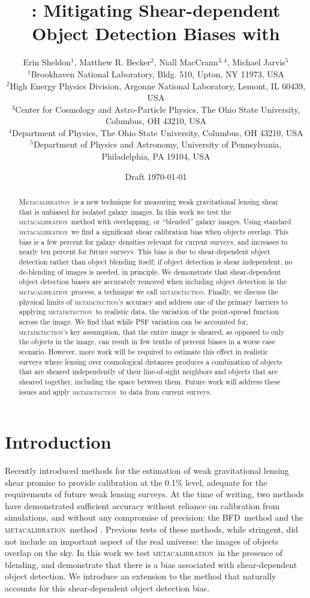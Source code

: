 \documentclass[fleqn,useAMS,usenatbib]{mnras}
\title[\Mdet]{\Mdet: Mitigating Shear-dependent Object Detection Biases with \Mcal}
\author[Sheldon et~al.]{Erin Sheldon$^1$, Matthew R. Becker$^2$,
Niall MacCrann$^{3,4}$, Michael Jarvis$^5$
  \\$^1$Brookhaven National Laboratory, Bldg. 510, Upton, NY 11973, USA
  \\$^2$High Energy Physics Division, Argonne National Laboratory, Lemont, IL 60439, USA
  \\$^3$Center for Cosmology and Astro-Particle Physics, The Ohio State University, Columbus, OH 43210, USA
  \\$^4$Department of Physics, The Ohio State University, Columbus, OH 43210, USA
  \\$^5$Department of Physics and Astronomy, University of Pennsylvania, Philadelphia, PA 19104, USA
}
\newcommand{\mcal}{\textsc{metacalibration}}
\newcommand{\mdet}{\textsc{metadetection}}
\newcommand{\Mcal}{\textsc{Metacalibration}}
\newcommand{\bfd}{\textsc{BFD}}
\begin{document}
\date{Draft \today}
\maketitle

\begin{abstract}

    \Mcal\ is a new technique for measuring weak gravitational lensing shear
    that is unbiased for isolated galaxy images.  In this work we test the
    \mcal\ method with overlapping, or ``blended'' galaxy images.  Using
    standard \mcal\ we find a significant shear calibration bias when objects
    overlap.  This bias is a few percent for galaxy densities relevant for
    current surveys, and increases to nearly ten percent for future surveys.
    This bias is due to shear-dependent object detection rather than object
    blending itself; if object detection is shear independent, no de-blending
    of images is needed, in principle.  We demonstrate that shear-dependent
    object detection biases are accurately removed when including object
    detection in the \mcal\ process, a technique we call \mdet. Finally, we
    discuss the physical limits of \mdet's accuracy and address one of the
    primary barriers to applying \mdet\ to realistic data, the variation of the
    point-spread function across the image. We find that while PSF variation
    can be accounted for, \mdet's key assumption, that the entire image is
    sheared, as opposed to only the objects in the image, can result in few
    tenths of percent biases in a worse case scenario. However, more work will
    be required to estimate this effect in realistic surveys where lensing over
    cosmological distances produces a combination of objects that are sheared
    independently of their line-of-sight neighbors and objects that are sheared
    together, including the space between them. Future work will address these
    issues and apply \mdet\ to data from current surveys.

\end{abstract}

\section{Introduction}


Recently introduced methods for the estimation of weak gravitational lensing
shear promise to provide calibration at the 0.1\% level, adequate for the
requirements of future weak lensing surveys.  At the time of writing, two
methods have demonstrated sufficient accuracy without reliance on calibration
from simulations, and without any compromise of precision: the \bfd\ method
\citep{BernBFD2016} and the \mcal\ method \citep{HuffMcal2017,SheldonMcal2017}.
Previous tests of these methods, while stringent, did not include an important
aspect of the real universe: the images of objects overlap on the sky. In this
work we test \mcal\ in the presence of blending, and demonstrate that there is
a bias associated with shear-dependent object detection. We introduce an
extension to the method that naturally accounts for this shear-dependent
object detection bias.
\end{document}
